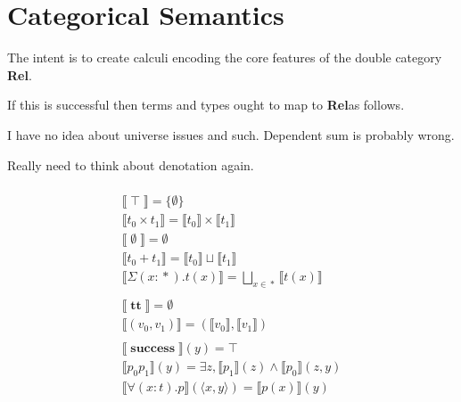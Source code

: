\documentclass[twocolumn]{scrartcl}
\newcommand{\Rel}{\textbf{Rel}}
\DeclareMathOperator{\unit}{\top}
\DeclareMathOperator{\mt}{\emptyset}
\DeclareMathOperator{\coin}{\textbf{tt}}
\DeclareMathOperator{\success}{\textbf{success}}
\DeclareMathOperator{\prop}{*}
\begin{document}
\section*{Categorical Semantics}

The intent is to create calculi encoding the core features of the
double category \Rel.

If this is successful then terms and types ought to map to \Rel as
follows.

\begin{center}
\end{center}

I have no idea about universe issues and such. Dependent sum is probably wrong.

Really need to think about denotation again.

\begin{multline*}
  \\
  \llbracket \unit \rrbracket = \{ \emptyset \} \\
  \llbracket t_0 \times t_1 \rrbracket = \llbracket t_0 \rrbracket \times \llbracket t_1 \rrbracket \\
  \llbracket \mt \rrbracket = \emptyset \\
  \llbracket t_0 + t_1 \rrbracket = \llbracket t_0 \rrbracket \sqcup \llbracket t_1 \rrbracket \\
  \llbracket \Sigma (x \colon \prop). t(x) \rrbracket = \bigsqcup_{ x \in \prop} \llbracket t(x) \rrbracket \\
  \\
  \llbracket \coin \rrbracket = \emptyset \\
  \llbracket ( v_0 , v_1 ) \rrbracket = ( \llbracket v_0 \rrbracket , \llbracket v_1 \rrbracket ) \\
  \\
  \llbracket \success \rrbracket(y) = \top \\
  \llbracket p_0 p_1 \rrbracket(y) = \exists z,  \llbracket p_1 \rrbracket (z) \wedge \llbracket p_0 \rrbracket (z, y)\\
  \llbracket \forall (x \colon t). p \rrbracket(\langle x, y \rangle) = \llbracket p(x) \rrbracket (y)  \\
\end{multline*}
\end{document}
